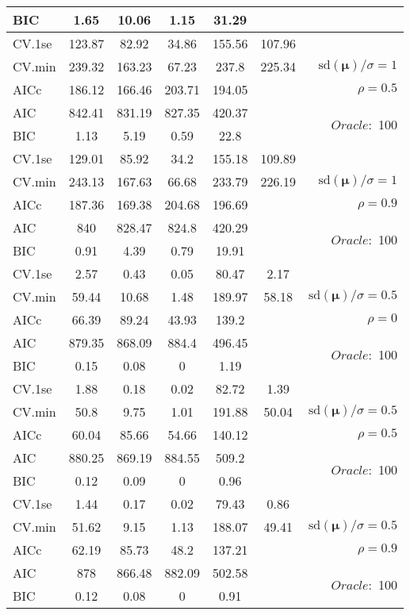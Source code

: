 \begin{table}
\begin{center}
\begin{tabular}{l*{5}{c}|r}
BIC & 1.65 & 10.06 & 1.15 & 31.29 & &  \\
 \hline 
CV.1se & 123.87 & 82.92 & 34.86 & 155.56 & 107.96 & \\
CV.min & 239.32 & 163.23 & 67.23 & 237.8 & 225.34 &  $\mathrm{sd}(\mathbf{\mu})/\sigma=1$ \\
AICc & 186.12 & 166.46 & 203.71 & 194.05 & & $\rho=0.5$ \\
AIC & 842.41 & 831.19 & 827.35 & 420.37 & &  \multirow{2}{*}{$Oracle: $ 100} \\
BIC & 1.13 & 5.19 & 0.59 & 22.8 & &  \\
 \hline 
CV.1se & 129.01 & 85.92 & 34.2 & 155.18 & 109.89 & \\
CV.min & 243.13 & 167.63 & 66.68 & 233.79 & 226.19 &  $\mathrm{sd}(\mathbf{\mu})/\sigma=1$ \\
AICc & 187.36 & 169.38 & 204.68 & 196.69 & & $\rho=0.9$ \\
AIC & 840 & 828.47 & 824.8 & 420.29 & &  \multirow{2}{*}{$Oracle: $ 100} \\
BIC & 0.91 & 4.39 & 0.79 & 19.91 & &  \\
 \hline 
CV.1se & 2.57 & 0.43 & 0.05 & 80.47 & 2.17 & \\
CV.min & 59.44 & 10.68 & 1.48 & 189.97 & 58.18 &  $\mathrm{sd}(\mathbf{\mu})/\sigma=0.5$ \\
AICc & 66.39 & 89.24 & 43.93 & 139.2 & & $\rho=0$ \\
AIC & 879.35 & 868.09 & 884.4 & 496.45 & &  \multirow{2}{*}{$Oracle: $ 100} \\
BIC & 0.15 & 0.08 & 0 & 1.19 & &  \\
 \hline 
CV.1se & 1.88 & 0.18 & 0.02 & 82.72 & 1.39 & \\
CV.min & 50.8 & 9.75 & 1.01 & 191.88 & 50.04 &  $\mathrm{sd}(\mathbf{\mu})/\sigma=0.5$ \\
AICc & 60.04 & 85.66 & 54.66 & 140.12 & & $\rho=0.5$ \\
AIC & 880.25 & 869.19 & 884.55 & 509.2 & &  \multirow{2}{*}{$Oracle: $ 100} \\
BIC & 0.12 & 0.09 & 0 & 0.96 & &  \\
 \hline 
CV.1se & 1.44 & 0.17 & 0.02 & 79.43 & 0.86 & \\
CV.min & 51.62 & 9.15 & 1.13 & 188.07 & 49.41 &  $\mathrm{sd}(\mathbf{\mu})/\sigma=0.5$ \\
AICc & 62.19 & 85.73 & 48.2 & 137.21 & & $\rho=0.9$ \\
AIC & 878 & 866.48 & 882.09 & 502.58 & &  \multirow{2}{*}{$Oracle: $ 100} \\
BIC & 0.12 & 0.08 & 0 & 0.91 & &  \\
 \hline 
\end{tabular}
\end{center}
\vspace{-1cm}
\end{table}





